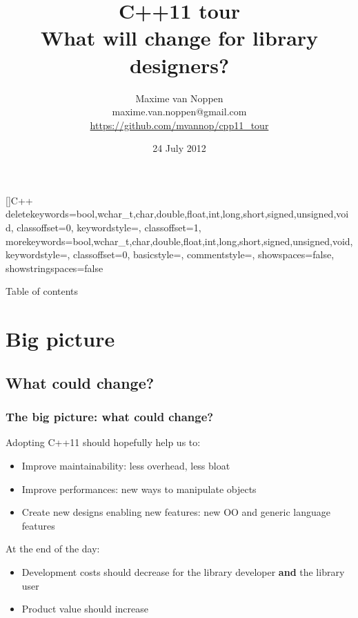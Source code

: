 \documentclass[xcolor=dvipsnames]{beamer}
\title[C++11 tour\hspace{25mm} \insertframenumber/\inserttotalframenumber]{C++11 tour\\What will change for library designers?}
\author[Maxime van Noppen]{Maxime van Noppen\\maxime.van.noppen@gmail.com\\\url{https://github.com/mvannop/cpp11_tour}}
\date{24 July 2012}
\begin{document}

[]{C++}%
  {
    deletekeywords={bool,wchar_t,char,double,float,int,long,short,signed,unsigned,void},
    classoffset=0,
    keywordstyle=\color{orange},
    classoffset=1,
    morekeywords={bool,wchar_t,char,double,float,int,long,short,signed,unsigned,void},
    keywordstyle=\color{blue},
    classoffset=0,
    basicstyle=\footnotesize,
    commentstyle=\color{red},
    showspaces=false,
    showstringspaces=false
  }%



\begin{frame}
\titlepage
\end{frame}

\begin{frame}{Table of contents}
\tableofcontents
\end{frame}

\section{Big picture}
\subsection{What could change?}
\begin{frame}
\frametitle{The big picture: what could change?}

Adopting C++11 should hopefully help us to:

\begin{itemize}
  \item Improve maintainability: less overhead, less bloat
  \pause
  \item Improve performances: new ways to manipulate objects
  \pause
  \item Create new designs enabling new features: new OO and generic language features
\end{itemize}

\pause
At the end of the day:
\begin{itemize}
  \item Development costs should decrease for the library developer \textbf{and} the library user
  \pause
  \item Product value should increase
\end{itemize}
\end{frame}
\end{document}
